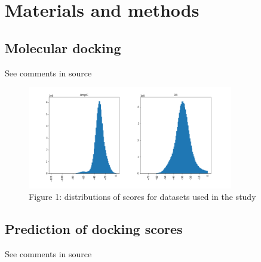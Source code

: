 \section{Materials and methods}

\subsection{Molecular docking}
See comments in source

\begin{figure}[h]
\centering
\includegraphics[width=0.8\textwidth]{figures/Figure_1.png}
\caption{Figure 1: distributions of scores for datasets used in the study}
\end{figure}


\subsection{Prediction of docking scores}
See comments in source

